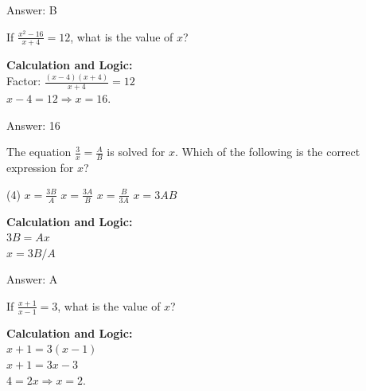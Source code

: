 \documentclass[11pt,paper=a4,answers]{exam}
\begin{document}
\begin{questions}
\begin{solution}
\vspace{30pt}

Answer: \colorbox{yellow!100}{B}
\end{solution}

\vspace{40pt}

\question
If $\frac{x^2 - 16}{x + 4} = 12$, what is the value of $x$?

\begin{solution}
\textbf{Calculation and Logic:} \\
Factor: $\frac{(x-4)(x+4)}{x+4} = 12$ \\
$x - 4 = 12 \Rightarrow x = 16$.

\vspace{30pt}

Answer: \colorbox{yellow!100}{16}
\end{solution}

\vspace{40pt}

\question
The equation $\frac{3}{x} = \frac{A}{B}$ is solved for $x$. Which of the following is the correct expression for $x$?
\begin{tasks}(4)
    \task $x = \frac{3B}{A}$
    \task $x = \frac{3A}{B}$
    \task $x = \frac{B}{3A}$
    \task $x = 3AB$
\end{tasks}

\begin{solution}
\textbf{Calculation and Logic:} \\
$3B = Ax$ \\
$x = 3B / A$

\vspace{30pt}

Answer: \colorbox{yellow!100}{A}
\end{solution}

\vspace{40pt}

\question
If $\frac{x+1}{x-1} = 3$, what is the value of $x$?

\begin{solution}
\textbf{Calculation and Logic:} \\
$x + 1 = 3(x - 1)$ \\
$x + 1 = 3x - 3$ \\
$4 = 2x \Rightarrow x = 2$.


\end{solution}
\end{questions}
\end{document}
